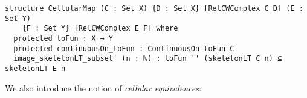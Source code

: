 \begin{lstlisting}[frame=single]
structure CellularMap (C : Set X) {D : Set X} [RelCWComplex C D] (E : Set Y) 
    {F : Set Y} [RelCWComplex E F] where
  protected toFun : X → Y
  protected continuousOn_toFun : ContinuousOn toFun C
  image_skeletonLT_subset' (n : ℕ) : toFun '' (skeletonLT C n) ⊆ skeletonLT E n
\end{lstlisting}

We also introduce the notion of \emph{cellular equivalences}: 

